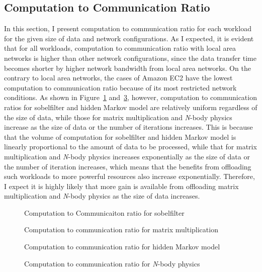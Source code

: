 \subsection{Computation to Communication Ratio}
\label{character:ctoc}
%
In this section, I present computation to communication ratio 
for each workload for the given size of data and network configurations.
%
As I expected, it is evident that for all workloads, computation to communication
ratio with local area networks is higher than other network
configurations, since the data transfer time becomes shorter by higher
network bandwidth from local area networks.
%
On the contrary to local area networks, the cases of Amazon EC2 have the
lowest computation to communication ratio because of its most restricted
network conditions.
%
As shown in Figure~\ref{fig:ctoc_sobelfilter} and~\ref{fig:ctoc_hmm}, however, 
computation to communication ratios 
for sobelfilter and hidden Markov model are relatively uniform
regardless of the size of data, while those for matrix multiplication
and {\it N}-body physics increase as the size of data or the
number of iterations increases. 
%
This is because that the volume of computation for sobelfilter and
hidden Markov model is linearly proportional to the amount of data to be
processed, while that for matrix multiplication and
{\it N}-body physics increases exponentially as the size of data or
the number of iteration increases, which means that the benefits from
offloading such workloads to more powerful resources also increase exponentially.
%
Therefore, I expect it is highly likely that more gain is available
from offloading matrix multiplication and \textit{N}-body physics 
as the size of data increases. 
%
\begin{figure}
\centering
{}
\caption{Computation to Communicaiton ratio for sobelfilter}
\label{fig:ctoc_sobelfilter}
\end{figure}
%
\begin{figure}
\centering
{}
\caption{Computation to communication ratio for matrix multiplication}
\label{fig:ctoc_matrix}
\end{figure}
%
\begin{figure}
\centering
{}
\caption{Computation to communication ratio for hidden Markov model}
\label{fig:ctoc_hmm}
\end{figure}
%
\begin{figure}
\centering
{}
\caption{Computation to communication ratio for {\it N}-body physics}
\label{fig:ctoc_nbody}
\end{figure}
%
